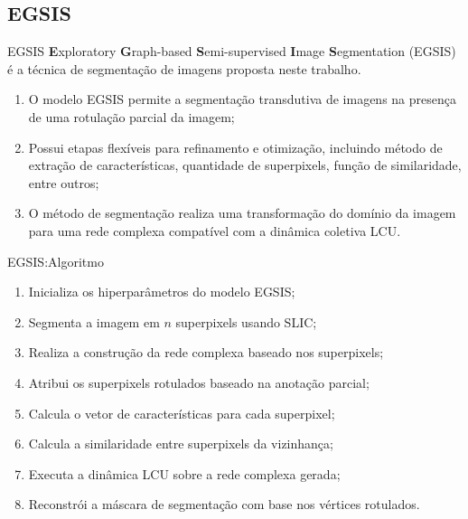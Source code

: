 \documentclass{templatebeamerufc/libs/ufc_format}
\begin{document}
\subsection{EGSIS}

\begin{frame}{EGSIS}
  \textbf{E}xploratory \textbf{G}raph-based
  \textbf{S}emi-supervised \textbf{I}mage \textbf{S}egmentation (EGSIS) é
  a técnica de segmentação de imagens proposta neste trabalho.

  \begin{enumerate}
  \item O modelo EGSIS permite a segmentação transdutiva de imagens
    na presença de uma rotulação parcial da imagem;
  \item Possui etapas flexíveis para refinamento e otimização,
    incluindo método de extração de características, quantidade de
    superpixels, função de similaridade, entre outros;
  \item O método de segmentação realiza uma transformação do domínio
    da imagem para uma rede complexa compatível com a dinâmica coletiva
    LCU.\@
  \end{enumerate}

\end{frame}

\begin{frame}{EGSIS:\@ Algoritmo}
  \begin{enumerate}
  \item Inicializa os hiperparâmetros do modelo EGSIS;\@
  \item Segmenta a imagem em $n$ superpixels usando SLIC;\@
  \item Realiza a construção da rede complexa baseado nos superpixels;
  \item Atribui os superpixels rotulados baseado na anotação parcial;
  \item Calcula o vetor de características para cada superpixel;
  \item Calcula a similaridade entre superpixels da vizinhança;
  \item Executa a dinâmica LCU sobre a rede complexa gerada;
  \item Reconstrói a máscara de segmentação com base nos vértices rotulados.
  \end{enumerate}
\end{frame}
\end{document}
